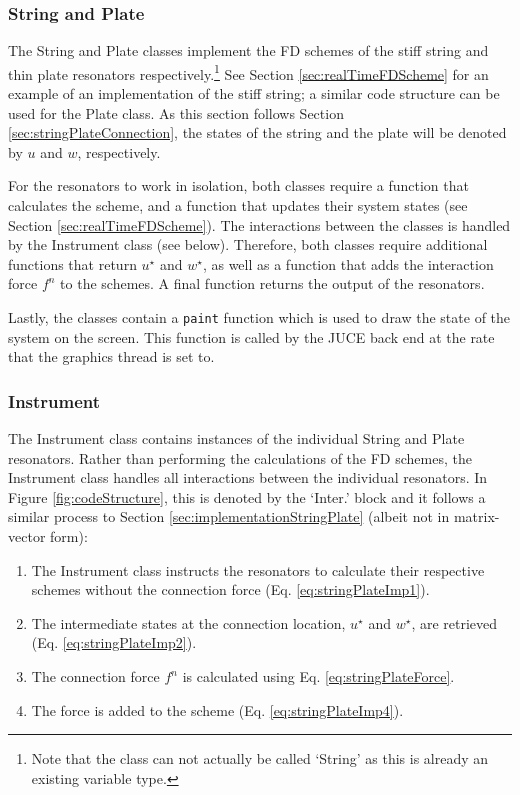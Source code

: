 \subsubsection{String and Plate}
The String and Plate classes implement the FD schemes of the stiff string and thin plate resonators respectively.\footnote{Note that the class can not actually be called `String' as this is already an existing variable type.} See Section \ref{sec:realTimeFDScheme} for an example of an implementation of the stiff string; a similar code structure can be used for the Plate class. As this section follows Section \ref{sec:stringPlateConnection}, the states of the string and the plate will be denoted by $u$ and $w$, respectively. 

For the resonators to work in isolation, both classes require a function that calculates the scheme, and a function that updates their system states (see Section \ref{sec:realTimeFDScheme}). The interactions between the classes is handled by the Instrument class (see below). Therefore, both classes require additional functions that return $u^\star$ and $w^\star$, as well as a function that adds the interaction force $f^n$ to the schemes. A final function returns the output of the resonators.

Lastly, the classes contain a \texttt{paint} function which is used to draw the state of the system on the screen. This function is called by the JUCE back end at the rate that the graphics thread is set to.

\subsubsection{Instrument}
The Instrument class contains instances of the individual String and Plate resonators. Rather than performing the calculations of the FD schemes, the Instrument class handles all interactions between the individual resonators. In Figure \ref{fig:codeStructure}, this is denoted by the `Inter.' block and it follows a similar process to Section \ref{sec:implementationStringPlate} (albeit not in matrix-vector form):
\begin{enumerate}
    \item The Instrument class instructs the resonators to calculate their respective schemes without the connection force (Eq. \eqref{eq:stringPlateImp1}).
    \item The intermediate states at the connection location, $u^\star$ and $w^\star$, are retrieved (Eq. \eqref{eq:stringPlateImp2}).
    \item The connection force $f^n$ is calculated using Eq. \eqref{eq:stringPlateForce}.
    \item The force is added to the scheme (Eq. \eqref{eq:stringPlateImp4}).
\end{enumerate}

